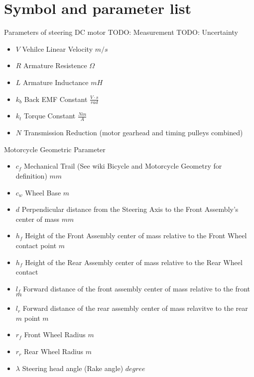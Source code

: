 \documentclass[11pt]{article}
\begin{document}
\section{Symbol and parameter list}
Parameters of steering DC motor
TODO: Measurement
TODO: Uncertainty
\begin{itemize}
\item $V$ Vehilce Linear Velocity $m/s$
\item $R$ Armature Resistence $\Omega$
\item $L$ Armature Inductance $mH$
\item $k_{b}$ Back EMF Constant $\frac{V \cdot s}{rad}$
\item $k_{t}$ Torque Constant $\frac{Nm}{A}$
\item $N$ Transmission Reduction (motor gearhead and timing pulleys combined)
\end{itemize}
Motorcycle Geometric Parameter
\begin{itemize}
\item $c_{f}$ Mechanical Trail (See wiki Bicycle and Motorcycle Geometry for definition) $mm$
\item $c_{w}$ Wheel Base $m$
\item $d$ Perpendicular distance from the Steering
Axis to the Front Assembly's center of
mass $mm$
\item $h_{f}$ Height of the Front Assembly center of
mass relative to the Front Wheel contact
point $m$
\item $h_{f}$ Height of the Rear Assembly center of
mass relative to the Rear Wheel contact
\item $l_{f}$ Forward distance of the front assembly
center of mass relative to the front $m$
\item $l_{r}$ Forward distance of the rear assembly center of mass relavitve to the rear $m$
point $m$
\item $r_{f}$ Front Wheel Radius $m$
\item $r_{r}$ Rear Wheel Radius $m$
\item $\lambda$ Steering head angle (Rake angle) $degree$
\end{itemize}
\end{document}
